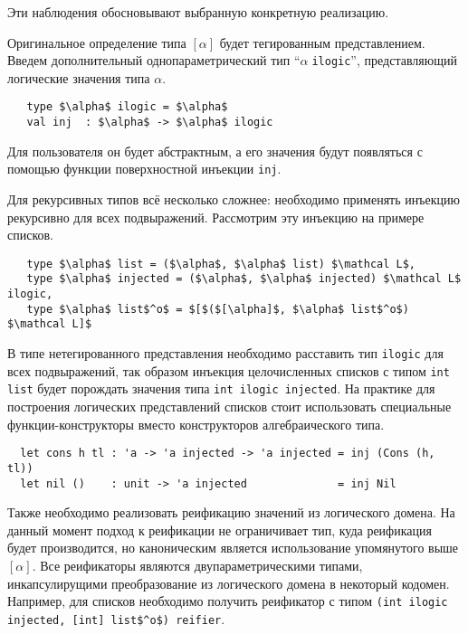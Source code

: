 
Эти наблюдения обосновывают выбранную конкретную реализацию.

Оригинальное определение типа $[\alpha]$ будет тегированным представлением.
Введем дополнительный однопараметрический тип \enquote{$\alpha\;$\lstinline|ilogic|}, %
представляющий логические значения типа $\alpha$.


\begin{lstlisting}
   type $\alpha$ ilogic = $\alpha$
   val inj  : $\alpha$ -> $\alpha$ ilogic
\end{lstlisting}

\noindent Для пользователя он будет абстрактным, а его значения будут появляться с помощью функции поверхностной инъекции \lstinline=inj=.

Для рекурсивных типов всё несколько сложнее: необходимо применять инъекцию рекурсивно для всех подвыражений. Рассмотрим эту инъекцию на примере списков.

\begin{lstlisting}
   type $\alpha$ list = ($\alpha$, $\alpha$ list) $\mathcal L$,
   type $\alpha$ injected = ($\alpha$, $\alpha$ injected) $\mathcal L$ ilogic,
   type $\alpha$ list$^o$ = $[$($[\alpha]$, $\alpha$ list$^o$) $\mathcal L]$
\end{lstlisting}

\noindent В типе нетегированного представления необходимо расставить тип \lstinline=ilogic= для всех подвыражений, так образом инъекция целочисленных списков с типом \lstinline=int list= будет порождать значения типа \lstinline=int ilogic injected=.
На практике для построения логических представлений списков стоит использовать специальные функции-конструкторы вместо конструкторов алгебраического типа.
\begin{lstlisting}
  let cons h tl : 'a -> 'a injected -> 'a injected = inj (Cons (h, tl))
  let nil ()    : unit -> 'a injected              = inj Nil
\end{lstlisting}

Также необходимо реализовать реификацию значений из логического домена.
На данный момент подход к реификации не ограничивает тип, куда реификация будет производится, но каноническим является использование упомянутого выше $[\alpha]$.
Все реификаторы являются двупараметрическими типами, инкапсулирущими преобразование из логического домена в некоторый кодомен.
Например, для списков необходимо получить реификатор с типом \lstinline=(int ilogic injected, [int] list$^o$) reifier=.

